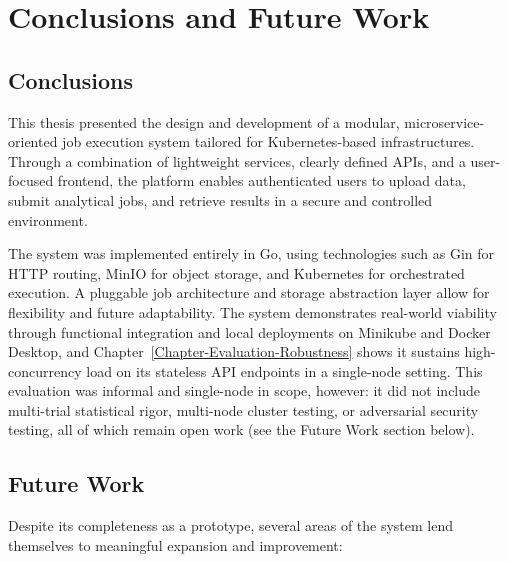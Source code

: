 \chapter{Conclusions and Future Work}
\label{Chapter-Conclusions}

\section{Conclusions}

This thesis presented the design and development of a modular, microservice-oriented job execution system tailored for Kubernetes-based infrastructures. Through a combination of lightweight services, clearly defined APIs, and a user-focused frontend, the platform enables authenticated users to upload data, submit analytical jobs, and retrieve results in a secure and controlled environment.

The system was implemented entirely in Go, using technologies such as Gin for HTTP routing, MinIO for object storage, and Kubernetes for orchestrated execution. A pluggable job architecture and storage abstraction layer allow for flexibility and future adaptability. The system demonstrates real-world viability through functional integration and local deployments on Minikube and Docker Desktop, and Chapter~\ref{Chapter-Evaluation-Robustness} shows it sustains high-concurrency load on its stateless API endpoints in a single-node setting. This evaluation was informal and single-node in scope, however: it did not include multi-trial statistical rigor, multi-node cluster testing, or adversarial security testing, all of which remain open work (see the Future Work section below).

\section{Future Work}

Despite its completeness as a prototype, several areas of the system lend themselves to meaningful expansion and improvement:

